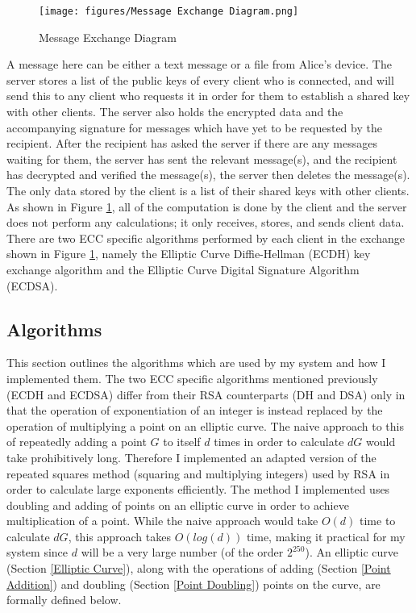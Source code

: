 \documentclass[12pt,a4paper]{article}
\begin{document}
\begin{figure}[!htb]
    \centering
    \texttt{[image: figures/Message Exchange Diagram.png]}
    \caption{Message Exchange Diagram}
    \label{fig:messages}
\end{figure}

A message here can be either a text message or a file from Alice's device. 
The server stores a list of the public keys of every client who is connected, 
and will send this to any client who requests it in order for them to establish a shared key with other clients. 
The server also holds the encrypted data and the accompanying signature for messages which have yet to be requested by the recipient. 
After the recipient has asked the server if there are any messages waiting for them, the server has sent the relevant message(s), 
and the recipient has decrypted and verified the message(s), the server then deletes the message(s). 
The only data stored by the client is a list of their shared keys with other clients. 
As shown in Figure \ref{fig:messages}, all of the computation is done by the client and the server does not perform any calculations; 
it only receives, stores, and sends client data. 
There are two ECC specific algorithms performed by each client in the exchange shown in Figure \ref{fig:messages}, 
namely the Elliptic Curve Diffie-Hellman (ECDH) key exchange algorithm and the Elliptic Curve Digital Signature Algorithm (ECDSA). 

\subsection{Algorithms} \noindent \label{Algorithms}
This section outlines the algorithms which are used by my system and how I implemented them. 
The two ECC specific algorithms mentioned previously (ECDH and ECDSA) differ from their RSA counterparts (DH and DSA) only in that 
the operation of exponentiation of an integer is instead replaced by the operation of multiplying a point on an elliptic curve. 
The naive approach to this of repeatedly adding a point $G$ to itself $d$ times in order to calculate $dG$ would take prohibitively long. 
Therefore I implemented an adapted version of the repeated squares method (squaring and multiplying integers) 
used by RSA in order to calculate large exponents efficiently. 
The method I implemented uses doubling and adding of points on an elliptic curve in order to achieve multiplication of a point. 
While the naive approach would take $O(d)$ time to calculate $dG$, this approach takes $O(log(d))$ time, 
making it practical for my system since $d$ will be a very large number (of the order $2^{250}$). 
An elliptic curve (Section \ref{Elliptic Curve}), along with the operations of adding (Section \ref{Point Addition}) 
and doubling (Section \ref{Point Doubling}) points on the curve, are formally defined below. 
\end{document}
